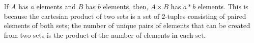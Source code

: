 If $ A $ has $ a $ elements and $ B $ has $ b $ elements, then, $ A \times B $ has $ a * b $ elements. This is because the cartesian product of two sets is a set of $2$-tuples consisting of paired elements of both sets; the number of unique pairs of elements that can be created from two sets is the product of the number of elements in each set.